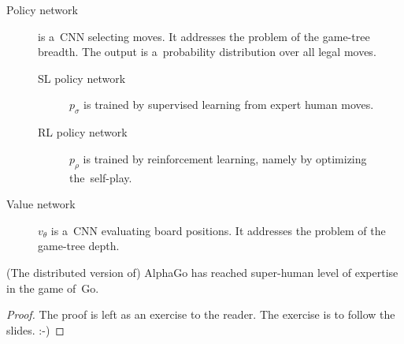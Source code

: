 \documentclass[a4paper,10pt]{article}
\begin{document}
\begin{description}
  \item [Policy network] is a~CNN selecting moves.
    It addresses the problem of the game-tree breadth.
    The output is a~probability distribution over all legal moves.
    \begin{description}
      \item [SL policy network] $p_\sigma$ is trained by supervised learning from expert human moves.
      \item [RL policy network] $p_\rho$ is trained by reinforcement learning, namely by optimizing the~self-play.
    \end{description}

  \item [Value network] $v_\theta$ is a~CNN evaluating board positions.
    It addresses the problem of the game-tree depth.
\end{description}

\begin{theorem}
  (The distributed version of) AlphaGo has reached super-human level of expertise in the game of~Go.
\end{theorem}

\begin{proof}
  The proof is left as an exercise to the reader.
  The exercise is to follow the slides.
  :-)
\end{proof}
\end{document}
